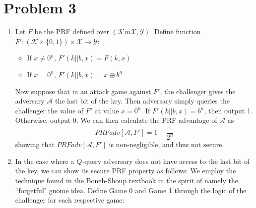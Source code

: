 \documentclass[11pt]{article}
\begin{document}
\section*{Problem 3}
\begin{enumerate}
  \item   Let $F$ be the PRF defined over $(\mathcal{K}m \mathcal{X}, \mathcal{Y})$. Define function $F': (\mathcal{K} \times \{0,1\}) \times \mathcal{X} \rightarrow \mathcal{Y}$:
  \begin{itemize}
    \item If $x \neq 0^n$, $F'(k||b, x) = F(k, x)$
    \item If $x = 0^n$, $F'(k || b, x) = x \oplus b^n $
  \end{itemize}
  Now suppose that in an attack game against $F'$, the challenger gives the adversary $\mathcal{A}$ the last bit of the key. Then adversary simply queries the challenger the value of $F'$ at value $x = 0^n$. If $F'(k || b, x) = b^n$, then output 1. Otherwise, output 0. We can then calculate the PRF advantage of $\mathcal{A}$ as
  \[ PRFadv[\mathcal{A}, F'] = 1 - \frac{1}{2^n}\]
  showing that $PRFadv[\mathcal{A}, F']$ is non-negligible, and thus not secure.
  \item In the case where a $Q$-query adversary does not have access to the last bit of the key, we can show its secure PRF property as follows:
  We employ the technique found in the Boneh-Shoup textbook in the spirit of namely the ``forgetful" gnome idea. Define Game 0 and Game 1 through the logic of the challenger for each respective game:


\end{enumerate}
\end{document}
